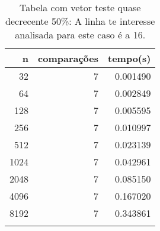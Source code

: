 \begin{table}[ht]
\centering
\begin{tabular}{rrr} \toprule
        n &    comparações &       tempo(s) \\ \midrule
      32  &              7 &      0.001490 \\
      64  &              7 &      0.002849 \\
     128  &              7 &      0.005595 \\
     256  &              7 &      0.010997 \\
     512  &              7 &      0.023139 \\
    1024  &              7 &      0.042961 \\
    2048  &              7 &      0.085150 \\
    4096  &              7 &      0.167020 \\
    8192  &              7 &      0.343861 \\
\bottomrule\addlinespace
\end{tabular}
\caption{Tabela com vetor teste quase decrecente 50\%: A linha te interesse analisada para este caso é a 16.}
\label{tab:radixsortQuaseDecresc50}
\end{table}
